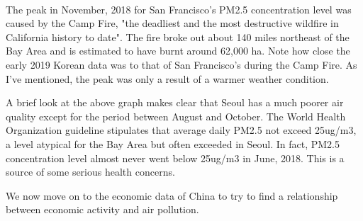 \documentclass[11pt]{article}
\begin{document}
    \begin{center}
    \end{center}
    { \hspace*{\fill} \\}
    
    The peak in November, 2018 for San Francisco's PM2.5 concentration level
was caused by the Camp Fire, "the deadliest and the most destructive
wildfire in California history to date". The fire broke out about 140
miles northeast of the Bay Area and is estimated to have burnt around
62,000 ha. Note how close the early 2019 Korean data was to that of San
Francisco's during the Camp Fire. As I've mentioned, the peak was only a
result of a warmer weather condition.

A brief look at the above graph makes clear that Seoul has a much poorer
air quality except for the period between August and October. The World
Health Organization guideline stipulates that average daily PM2.5 not
exceed 25ug/m3, a level atypical for the Bay Area but often exceeded in
Seoul. In fact, PM2.5 concentration level almost never went below
25ug/m3 in June, 2018. This is a source of some serious health concerns.

We now move on to the economic data of China to try to find a
relationship between economic activity and air pollution.
\end{document}
